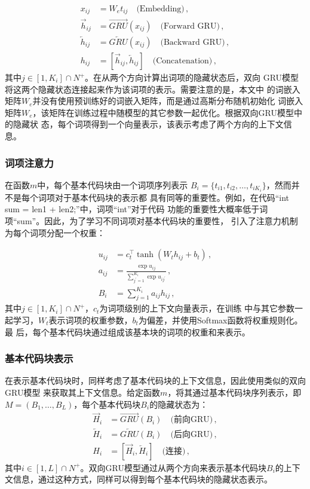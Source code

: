 \begin{align}
	x_{ij} &= W_e t_{ij} \quad\text{(Embedding)} \,, \\
	\overrightarrow{h}_{ij} &= \overrightarrow{GRU}(x_{ij}) 
	\quad\text{(Forward GRU)} \,, \\
       \overleftarrow{h}_{ij} &= \overleftarrow{GRU}(x_{ij}) 
       \quad\text{(Backward GRU)} \,, \\
       h_{ij} &= [\overrightarrow{h}_{ij}, \overleftarrow{h}_{ij}] 
       \quad\text{(Concatenation)} \,,
\label{eq:token_encoder}
\end{align}
其中$j\in [1, K_i] \cap N^+$。在从两个方向计算出词项的隐藏状态后，双向
GRU模型将这两个隐藏状态连接起来作为该词项的表示。需要注意的是，本文中
的词嵌入矩阵$W_e$并没有使用预训练好的词嵌入矩阵，而是通过高斯分布随机初始化
词嵌入矩阵$W_e$，该矩阵在训练过程中随模型的其它参数一起优化。根据双向GRU模型中的隐藏状
态，每个词项得到一个向量表示，该表示考虑了两个方向的上下文信息。

\subsubsection{词项注意力}
在函数$m$中，每个基本代码块由一个词项序列表示
$B_i=\{t_{i1},t_{i2},\dots,t_{iK_i}\}$，然而并不是每个词项对于基本代码块的表示都
具有同等的重要性。例如，在代码``int sum = len1 + len2;''中，词项``int''对于代码
功能的重要性大概率低于词项``sum''。因此，为了学习不同词项对基本代码块的重要性，
引入了注意力机制为每个词项分配一个权重：

\begin{align}
    u_{ij} &= c_t^\top \tanh(W_t h_{ij} + b_t) \,, \\
    a_{ij} &= \frac{\exp{u_{ij}}}{\sum_{j^\prime=1}^{K_i} \exp{u_{ij^\prime}}} 
    \,, \\
    B_{i} &= \sum_{j=1}^{K_i} a_{ij}h_{ij} \,,
\label{eq:token_attn}
\end{align}
其中$j\in [1, K_i] \cap N^+$，$c_t$为词项级别的上下文向量表示，在训练
中与其它参数一起学习，$W_t$表示词项的权重参数，$b_t$为偏差，并使用Softmax函数将权重规则化。最
后，每个基本代码块通过组成该基本块的词项的权重和来表示。

\subsubsection{基本代码块表示}
在表示基本代码块时，同样考虑了基本代码块的上下文信息，因此使用类似的双向GRU模型
来获取其上下文信息。给定函数$m$，将其通过基本代码块序列表示，即$M = (B_1, \dots,
B_L)$，每个基本代码块$B_i$的隐藏状态为：
\begin{align}
    \overrightarrow{H}_i &= \overrightarrow{GRU}(B_{i}) 
\quad\text{(前向GRU)} \,, \\
    \overleftarrow{H}_i &= \overleftarrow{GRU}(B_i) 
\quad\text{(后向GRU)} \,, \\
    H_i &= [\overrightarrow{H}_i, \overleftarrow{H}_i] 
\quad\text{(连接)} \,,
\label{eq:block_encoder}
\end{align}
其中$i\in [1, L] \cap N^+$。双向GRU模型通过从两个方向来表示基本代码块$B_i$的上下
文信息，通过这种方式，同样可以得到每个基本代码块的隐藏状态表示。

